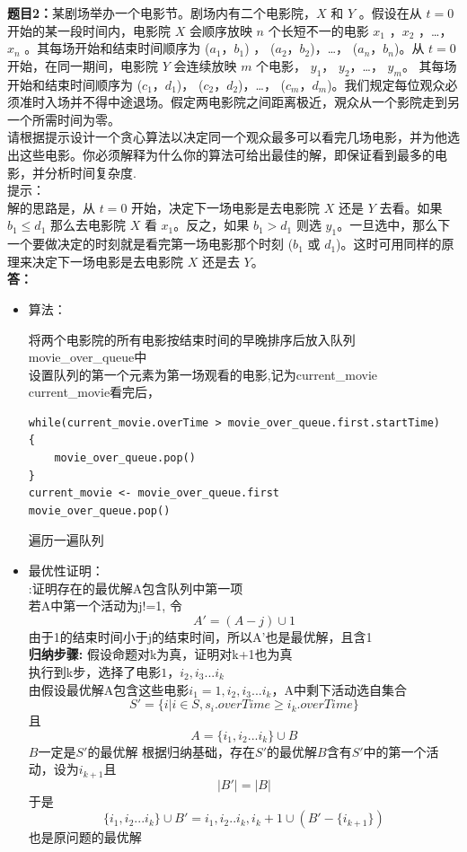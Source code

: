 \documentclass[12pt,a4paper]{article}
\begin{document}
\begin{CJK*}{UTF8}{gbsn}
		\vspace{10pt}
		\noindent
		{\bf 题目2：}某剧场举办一个电影节。剧场内有二个电影院，$X$ 和 $Y$ 。假设在从 $t = 0$ 开始的某一段时间内，电影院 $X$ 会顺序放映 $n$ 个长短不一的电影 $x_1$ ，$x_2$ ，…， $x_n$ 。其每场开始和结束时间顺序为 ($a_1$，$b_1$) ， ($a_2$，$b_2$)，…， ($a_n$，$b_n$)。从 $t = 0$ 开始，在同一期间，电影院 $Y$ 会连续放映 $m$ 个电影， $y_1$， $y_2$，…， $y_m$。 其每场开始和结束时间顺序为 ($c_1$，$d_1$)， ($c_2$，$d_2$)，…， ($c_m$，$d_m$)。我们规定每位观众必须准时入场并不得中途退场。假定两电影院之间距离极近，覌众从一个影院走到另一个所需时间为零。\\
		请根据提示设计一个贪心算法以决定同一个观众最多可以看完几场电影，并为他选出这些电影。你必须解释为什么你的算法可给出最佳的解，即保证看到最多的电影，并分析时间复杂度.\\
		提示：\\
		解的思路是，从 $t = 0$ 开始，决定下一场电影是去电影院 $X$ 还是 $Y$ 去看。如果 $b_1 \leq d_1$ 那么去电影院 $X$ 看 $x_1$。反之，如果 $b_1 > d_1$ 则选 $y_1$。一旦选中，那么下一个要做决定的时刻就是看完第一场电影那个时刻 ($b_1$ 或 $d_1$)。这时可用同样的原理来决定下一场电影是去电影院 $X$ 还是去 $Y$。
		\\	

		\vspace{5pt}
		\noindent
		{\bf 答：}

		\begin{itemize}
			\item 算法：

				将两个电影院的所有电影按结束时间的早晚排序后放入队列movie\_over\_queue中\\

				设置队列的第一个元素为第一场观看的电影,记为current\_movie\\
				current\_movie看完后，

				\begin{lstlisting}
while(current_movie.overTime > movie_over_queue.first.startTime)
{
	movie_over_queue.pop()
} 
current_movie <- movie_over_queue.first
movie_over_queue.pop()
				\end{lstlisting}

				遍历一遍队列

			\item 最优性证明：\\
				{:}证明存在的最优解A包含队列中第一项\\
				若A中第一个活动为j!=1,
				令$$A' = (A -{j})\cup{1}$$由于1的结束时间小于j的结束时间，所以A'也是最优解，且含1\\
				{\bf 归纳步骤:}
				假设命题对k为真，证明对k+1也为真\\
				执行到k步，选择了电影$1，i_2,i_3...i_k$\\
				由假设最优解A包含这些电影$i_1=1, i_2, i_3...i_k$，A中剩下活动选自集合
				$$S'=\{i|i \in S, s_i.overTime \geq i_k.overTime\}$$
				且
				$$
				A=\{i_1,i_2...i_k\}\cup B
				$$
				$B$一定是$S'$的最优解
				根据归纳基础，存在$S'$的最优解$B$含有$S'$中的第一个活动，设为$i_{k+1}$且
				$$|B'|=|B|$$
				于是
				$$\{i_1,i_2...i_k\} \cup B' = {i_1,i_2..i_k,i_k+1}\cup (B'-\{i_{k+1}\})$$
				也是原问题的最优解


\end{itemize}
\end{CJK*}
\end{document}
